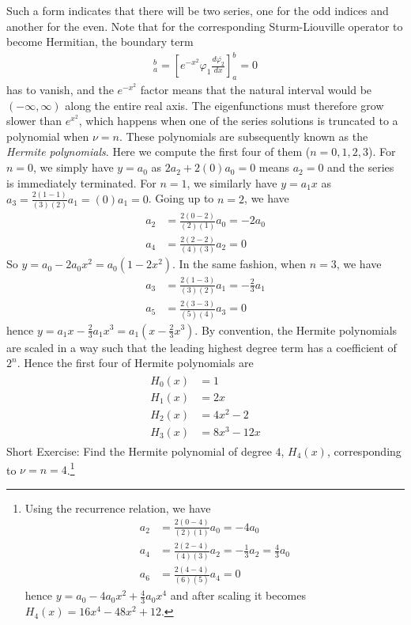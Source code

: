 \begin{solution}
Such a form indicates that there will be two series, one for the odd indices and another for the even. Note that for the corresponding Sturm-Liouville operator to become Hermitian, the boundary term 
\begin{align*}
[\varphi_1 p(x) \frac{d\overline{\varphi_2}}{dx}]_a^b = [e^{-x^2} \varphi_1 \frac{d\overline{\varphi_2}}{dx}]_a^b = 0
\end{align*}
has to vanish, and the $e^{-x^2}$ factor means that the natural interval would be $(-\infty, \infty)$ along the entire real axis. The eigenfunctions must therefore grow slower than $e^{x^2}$, which happens when one of the series solutions is truncated to a polynomial when $\nu = n$. These polynomials are subsequently known as the \textit{Hermite polynomials}. Here we compute the first four of them ($n=0,1,2,3$). For $n=0$, we simply have $y = a_0$ as $2a_2 + 2(0)a_0 = 0$ means $a_2 = 0$ and the series is immediately terminated. For $n=1$, we similarly have $y = a_1x$ as $a_3 = \frac{2(1-1)}{(3)(2)}a_1 = (0)a_1 = 0$. Going up to $n=2$, we have
\begin{align*}
a_2 &= \frac{2(0-2)}{(2)(1)}a_0 = -2a_0 \\
a_4 &= \frac{2(2-2)}{(4)(3)}a_2 = 0
\end{align*}
So $y = a_0 - 2a_0 x^2 = a_0(1-2x^2)$. In the same fashion, when $n=3$, we have
\begin{align*}
a_3 &= \frac{2(1-3)}{(3)(2)}a_1 = -\frac{2}{3}a_1 \\
a_5 &= \frac{2(3-3)}{(5)(4)}a_3 = 0
\end{align*}
hence $y = a_1x - \frac{2}{3}a_1x^3 = a_1(x-\frac{2}{3}x^3)$. By convention, the Hermite polynomials are scaled in a way such that the leading highest degree term has a coefficient of $2^n$. Hence the first four of Hermite polynomials are
\begin{align}
\begin{aligned}
H_0(x) &= 1 \\
H_1(x) &= 2x \\
H_2(x) &= 4x^2 - 2 \\
H_3(x) &= 8x^3 - 12x
\end{aligned}
\end{align}    
Short Exercise: Find the Hermite polynomial of degree $4$, $H_4(x)$, corresponding to $\nu = n = 4$.\footnote{Using the recurrence relation, we have
\begin{align*}
a_2 &= \frac{2(0-4)}{(2)(1)}a_0 = -4a_0 \\
a_4 &= \frac{2(2-4)}{(4)(3)}a_2 = -\frac{1}{3}a_2 = \frac{4}{3}a_0 \\
a_6 &= \frac{2(4-4)}{(6)(5)}a_4 = 0
\end{align*}
hence $y = a_0 - 4a_0x^2 + \frac{4}{3}a_0x^4$ and after scaling it becomes $H_4(x) = 16x^4 - 48x^2 + 12$.}
\end{solution}

